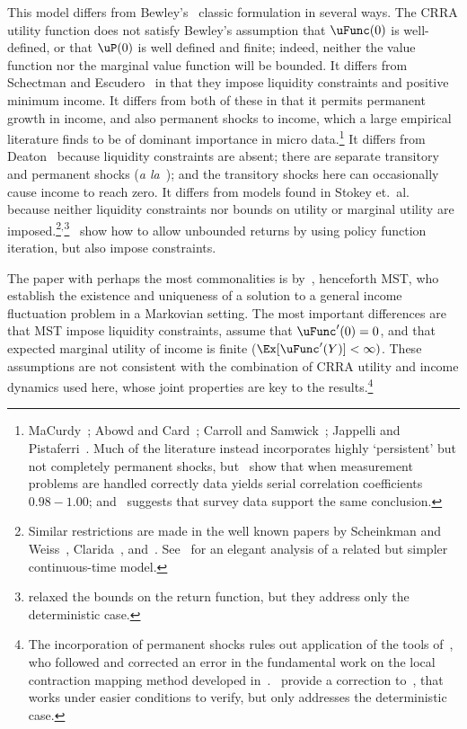 \documentclass[BufferStockTheory]{subfiles}
\begin{document}
\hypertarget{DiffFromLit}{} This model differs from Bewley's~\citeyearpar{bewleyPIH} classic formulation in several ways. The CRRA utility function does not satisfy Bewley's assumption that $\uFunc(0)$ is well-defined, or that $\uP(0)$ is well defined and finite; indeed, neither the value function nor the marginal value function will be bounded.  It differs from Schectman and Escudero~\citeyearpar{seIncFluct} in that they impose liquidity constraints and positive minimum income.  It differs from both of these in that it permits permanent growth in income, and also permanent shocks to income, which a large empirical literature finds to be of dominant importance in micro data.\footnote{MaCurdy~\citeyearpar{macurdyTimeseries}; Abowd and Card~\citeyearpar{acCovariance}; Carroll and Samwick~\citeyearpar{csNature}; Jappelli and Pistaferri~\citeyearpar{jpCins}.  Much of the literature instead incorporates highly `persistent' but not completely permanent shocks, but~\cite{dhmImproving} show that when measurement problems are handled correctly data yields serial correlation coefficients $0.98-1.00$; and~\cite{dmHowMuch} suggests that survey data support the same conclusion.}  It differs from Deaton~\citeyearpar{deatonLiqConstr} because liquidity constraints are absent; there are separate transitory and permanent shocks (\textit{a la}~\cite{muthOptimal}); and the transitory shocks here can occasionally cause income to reach zero.%
It differs from models found in Stokey et.\ al.~\citeyearpar{slpMethods} because neither liquidity constraints nor bounds on utility or marginal utility are imposed.\footnote{Similar restrictions are made in the well known papers by Scheinkman and Weiss~\citeyearpar{scheinkman&weiss:borrowing}, Clarida~\citeyearpar{claridaErgodic}, and~\cite{cwcUnderUncert}.  See~\cite{tocheUrisk} for an elegant analysis of a related but simpler continuous-time model.}$^{,}$\footnote{\cite{asHomogeneous} relaxed the bounds on the return function, but they address only the deterministic case.}~\cite{lsIncFluct} show how to allow unbounded returns by using policy function iteration, but also impose constraints.

The paper with perhaps the most commonalities is by~\cite{mstIncFluct}, henceforth MST, who establish the existence and uniqueness of a solution to a general income fluctuation problem in a Markovian setting.  The most important differences are that MST impose liquidity constraints, assume that $\uFunc^{\prime}(0)=0$, and that expected marginal utility of income is finite ($\Ex[\uFunc^{\prime}(Y)]<\infty)$.  These assumptions are not consistent with the combination of CRRA utility and income dynamics used here, whose joint properties are key to the results.\footnote{The incorporation of permanent shocks rules out application of the tools of~\cite{mnUnique}, who followed and corrected an error in the fundamental work on the local contraction mapping method developed in~\cite{rrExistence}.\@~\cite{mvExistence} provide a correction to~\cite{rrExistence}, that works under easier conditions to verify, but only addresses the deterministic case.}
\end{document}
